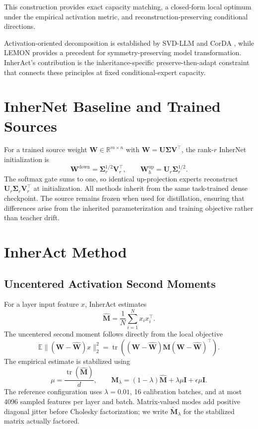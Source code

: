 \documentclass{article}
\DeclareMathOperator{\tr}{tr}
\newcommand{\R}{\mathbb{R}}
\newcommand{\E}{\mathbb{E}}
\newcommand{\bW}{\mathbf{W}}
\newcommand{\bM}{\mathbf{M}}
\newcommand{\bU}{\mathbf{U}}
\newcommand{\bV}{\mathbf{V}}
\newcommand{\bSigma}{\mathbf{\Sigma}}
\begin{document}
This construction provides exact capacity matching, a closed-form local optimum
under the empirical activation metric, and reconstruction-preserving
conditional directions.

Activation-oriented decomposition is established by SVD-LLM
\cite{wang2025svdllm} and CorDA \cite{yang2024corda}, while LEMON
\cite{wang2024lemon} provides a precedent for symmetry-preserving model
transformation.  InherAct's contribution is the inheritance-specific
preserve-then-adapt constraint that connects these principles at fixed
conditional-expert capacity.

\section{InherNet Baseline and Trained Sources}

For a trained source weight $\bW\in\R^{m\times n}$ with
$\bW=\bU\bSigma\bV^\top$, the rank-$r$ InherNet initialization is
\begin{equation}
  \bW^{\mathrm{down}}=\bSigma_r^{1/2}\bV_r^\top,
  \qquad
  \bW_h^{\mathrm{up}}=\bU_r\bSigma_r^{1/2}.
  \label{eq:inher-init}
\end{equation}
The softmax gate sums to one, so identical up-projection experts reconstruct
$\bU_r\bSigma_r\bV_r^\top$ at initialization.  All methods inherit from the
same task-trained dense checkpoint.  The source remains frozen when used for
distillation, ensuring that differences arise from the inherited
parameterization and training objective rather than teacher drift.

\section{InherAct Method}

\subsection{Uncentered Activation Second Moments}

For a layer input feature $x$, InherAct estimates
\begin{equation}
  \widehat{\bM}=\frac{1}{N}\sum_{i=1}^{N}x_ix_i^\top.
  \label{eq:second-moment}
\end{equation}
The uncentered second moment follows directly from the local objective
\begin{equation}
  \E\| (\bW-\widehat{\bW})x\|_2^2
  =\tr\!\left((\bW-\widehat{\bW})\bM
              (\bW-\widehat{\bW})^\top\right).
  \label{eq:local-error}
\end{equation}
The empirical estimate is stabilized using
\begin{equation}
  \mu=\frac{\tr(\widehat{\bM})}{d},\qquad
  \bM_\lambda=(1-\lambda)\widehat{\bM}
  +\lambda\mu\mathbf{I}+\epsilon\mu\mathbf{I}.
  \label{eq:shrinkage}
\end{equation}
The reference configuration uses $\lambda=0.01$, 16 calibration batches, and
at most 4096 sampled features per layer and batch.  Matrix-valued modes add
positive diagonal jitter before Cholesky factorization; we write
$\widetilde{\bM}_\lambda$ for the stabilized matrix actually factored.
\end{document}
